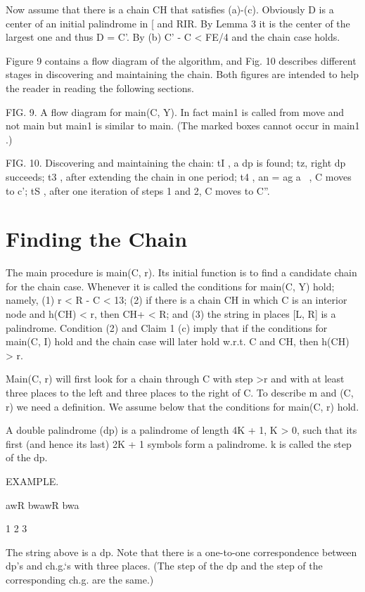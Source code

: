 \documentclass[11pt,a4paper]{report}
\begin{document}
Now assume that there is a chain CH that satisfies (a)-(c). Obviously D is a center of an
initial palindrome in [ and  RIR. By Lemma 3 it is the center of the largest one and thus
D = C’. By (b) C’ - C < FE/4 and the chain case holds. 

Figure 9 contains a flow diagram of the algorithm, and Fig. 10 describes different
stages in discovering and maintaining the chain. Both figures are intended to help the
reader in reading the following sections.

FIG. 9. A flow diagram for main(C, Y). In fact main1 is called from move and not main but main1
is similar to main. (The marked boxes cannot occur in main1 .) 


FIG. 10. Discovering and maintaining the chain: tI , a dp is found; tz, right dp succeeds;
t3 , after extending the chain in one period; t4 , an = ag a~ , C moves to c’; tS , after one iteration
of steps 1 and 2, C moves to C”. 

\chapter{Finding the Chain}

The main procedure is main(C, r). Its initial function is to find a candidate chain for
the chain case. Whenever it is called the conditions for main(C, Y) hold; namely, (1) r <
R - C < 13; (2) if there is a chain CH in which C is an interior node and h(CH) < r,
then CH+ < R; and (3) the string in places [L, R] is a palindrome. Condition (2) and
Claim 1 (c) imply that if the conditions for main(C, I) hold and the chain case will later
hold w.r.t. C and CH, then h(CH) > r.

Main(C, r) will first look for a chain through C with step >r and with at least three
places to the left and three places to the right of C. To describe m and (C, r) we need a
definition. We assume below that the conditions for main(C, r) hold.

A double palindrome (dp) is a palindrome of length 4K + 1, K > 0, such that its first
(and hence its last) 2K + 1 symbols form a palindrome. k is called the step of the dp.

EXAMPLE.

awR bwawR bwa

1 2 3

The string above is a dp. Note that there is a one-to-one correspondence between dp’s
and ch.g.‘s with three places. (The step of the dp and the step of the corresponding ch.g.
are the same.)
\end{document}
